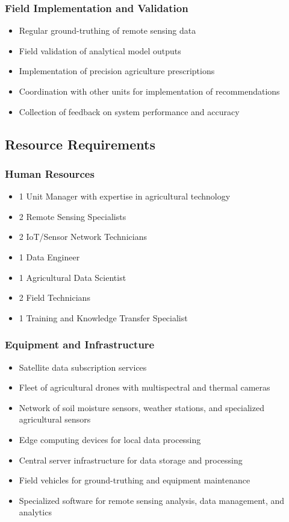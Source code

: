 \subsubsection{Field Implementation and Validation}
\begin{itemize}
    \item Regular ground-truthing of remote sensing data
    \item Field validation of analytical model outputs
    \item Implementation of precision agriculture prescriptions
    \item Coordination with other units for implementation of recommendations
    \item Collection of feedback on system performance and accuracy
\end{itemize}

\subsection{Resource Requirements}

\subsubsection{Human Resources}
\begin{itemize}
    \item 1 Unit Manager with expertise in agricultural technology
    \item 2 Remote Sensing Specialists
    \item 2 IoT/Sensor Network Technicians
    \item 1 Data Engineer
    \item 1 Agricultural Data Scientist
    \item 2 Field Technicians
    \item 1 Training and Knowledge Transfer Specialist
\end{itemize}

\subsubsection{Equipment and Infrastructure}
\begin{itemize}
    \item Satellite data subscription services
    \item Fleet of agricultural drones with multispectral and thermal cameras
    \item Network of soil moisture sensors, weather stations, and specialized agricultural sensors
    \item Edge computing devices for local data processing
    \item Central server infrastructure for data storage and processing
    \item Field vehicles for ground-truthing and equipment maintenance
    \item Specialized software for remote sensing analysis, data management, and analytics
\end{itemize}

